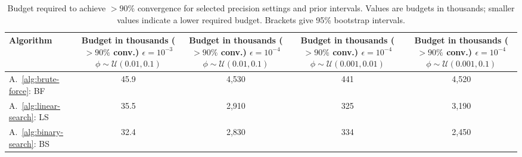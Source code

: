 \begin{table}[ht]
\centering
\scriptsize
\setlength{\tabcolsep}{3pt}
\caption{Budget required to achieve $>90\%$ convergence for selected precision settings and prior intervals. Values are budgets in thousands; smaller values indicate a lower required budget. Brackets give 95\% bootstrap intervals.}
\label{tab:summary-all-ci}
\begin{tabular}{l c c c c}
\toprule
Algorithm
& \makecell{Budget in thousands\\ ($>90\%$ conv.) \\ $\epsilon={10^{-3}}$ \\ $\phi \sim \mathcal{U}(0.01,0.1)$}
& \makecell{Budget in thousands\\ ($>90\%$ conv.) \\ $\epsilon={10^{-4}}$ \\ $\phi \sim \mathcal{U}(0.01,0.1)$}
& \makecell{Budget in thousands\\ ($>90\%$ conv.) \\ $\epsilon={10^{-4}}$ \\ $\phi \sim \mathcal{U}(0.001,0.01)$}
& \makecell{Budget in thousands\\ ($>90\%$ conv.) \\ $\epsilon={10^{-4}}$ \\ $\phi \sim \mathcal{U}(0.001,0.1)$} \\
\midrule
A.~\ref{alg:brute-force}: BF
& 45.9 \newline {\scriptsize [45.3, 46.5]}
& 4{,}530 \newline {\scriptsize [4{,}460, 4{,}590]}
& 441 \newline {\scriptsize [436, 447]}
& 4{,}520 \newline {\scriptsize [4{,}460, 4{,}580]} \\
A.~\ref{alg:linear-search}: LS
& 35.5 \newline {\scriptsize [34.9, 36]}
& 2{,}910 \newline {\scriptsize [2{,}860, 2{,}960]}
& 325 \newline {\scriptsize [321, 329]}
& 3{,}190 \newline {\scriptsize [3{,}150, 3{,}240]} \\
A.~\ref{alg:binary-search}: BS
& 32.4 \newline {\scriptsize [32, 32.9]}
& 2{,}830 \newline {\scriptsize [2{,}800, 2{,}870]}
& 334 \newline {\scriptsize [330, 338]}
& 2{,}450 \newline {\scriptsize [2{,}420, 2{,}480]} \\

\end{tabular}
\end{table}

